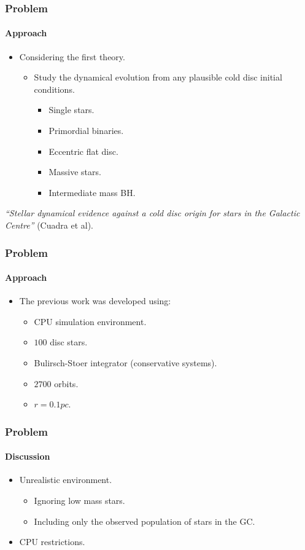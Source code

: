 \begin{frame}
    \frametitle{Problem}
    \framesubtitle{Approach}

    \begin{itemize}
        \item Considering the first theory.
        \begin{itemize}
            \item Study the dynamical evolution from any plausible
                  cold disc initial conditions.
            \begin{itemize}
                \item Single stars.
                \item Primordial binaries.
                \item Eccentric flat disc.
                \item Massive stars.
                \item Intermediate mass BH.
            \end{itemize}
        \end{itemize}
    \end{itemize}

    \emph{``Stellar dynamical evidence against a cold disc origin
    for stars in the Galactic Centre''} (Cuadra et al).
\end{frame}

\begin{frame}
    \frametitle{Problem}
    \framesubtitle{Approach}
    \begin{itemize}
        \item The previous work was developed using:
        \begin{itemize}
            \item CPU simulation environment.
            \item $100$ disc stars.
            \item Bulirsch-Stoer integrator (conservative systems).
            \item $2700$ orbits.
            \item $r = 0.1 pc$.
        \end{itemize}
    \end{itemize}
\end{frame}

\begin{frame}
    \frametitle{Problem}
    \framesubtitle{Discussion}
    \begin{itemize}
        \item Unrealistic environment.
        \begin{itemize}
            \item Ignoring low mass stars.
            \item Including only the observed population of stars in the GC.
        \end{itemize}
        \item CPU restrictions.
    \end{itemize}
\end{frame}
